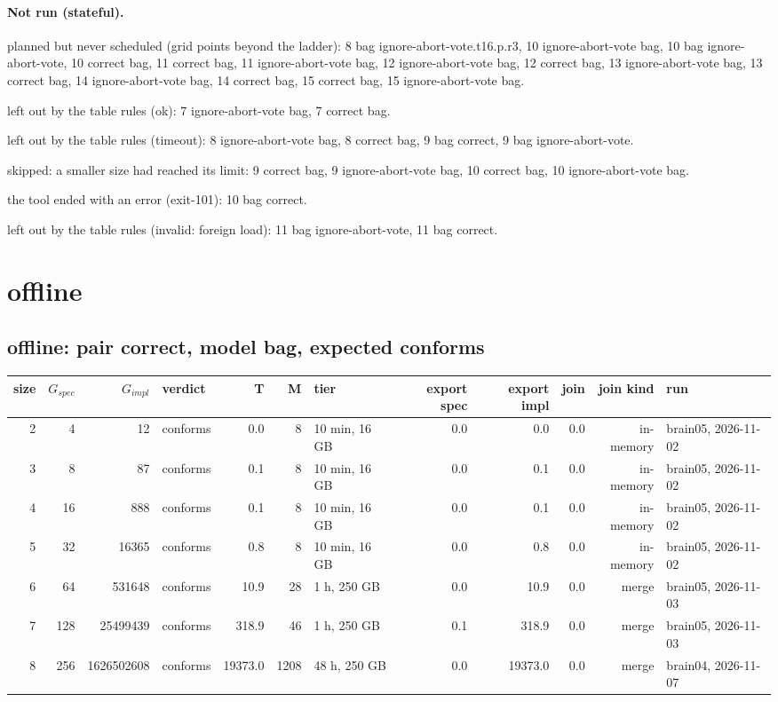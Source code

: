 \documentclass[10pt]{article}
\begin{document}
\paragraph{Not run (stateful).}
planned but never scheduled (grid points beyond the ladder): 8 bag ignore-abort-vote.t16.p.r3, 10 ignore-abort-vote bag, 10 bag ignore-abort-vote, 10 correct bag, 11 correct bag, 11 ignore-abort-vote bag, 12 ignore-abort-vote bag, 12 correct bag, 13 ignore-abort-vote bag, 13 correct bag, 14 ignore-abort-vote bag, 14 correct bag, 15 correct bag, 15 ignore-abort-vote bag.\par
left out by the table rules (ok): 7 ignore-abort-vote bag, 7 correct bag.\par
left out by the table rules (timeout): 8 ignore-abort-vote bag, 8 correct bag, 9 bag correct, 9 bag ignore-abort-vote.\par
skipped: a smaller size had reached its limit: 9 correct bag, 9 ignore-abort-vote bag, 10 correct bag, 10 ignore-abort-vote bag.\par
the tool ended with an error (exit-101): 10 bag correct.\par
left out by the table rules (invalid: foreign load): 11 bag ignore-abort-vote, 11 bag correct.\par
\section*{offline}
\subsection*{offline: pair \textsf{correct}, model bag, expected conforms}
\begin{longtable}{@{}rrrlrrlrrrrl@{}}
\toprule
size & $G_{\mathit{spec}}$ & $G_{\mathit{impl}}$ & verdict & T & M & tier & export spec & export impl & join & join kind & run \\
\midrule
\endhead
\color{red} 2 & 4 & 12 & conforms & 0.0 & 8 & 10 min, 16 GB & 0.0 & 0.0 & 0.0 & in-memory & brain05, 2026-11-02 \\
\color{red} 3 & 8 & 87 & conforms & 0.1 & 8 & 10 min, 16 GB & 0.0 & 0.1 & 0.0 & in-memory & brain05, 2026-11-02 \\
\color{red} 4 & 16 & 888 & conforms & 0.1 & 8 & 10 min, 16 GB & 0.0 & 0.1 & 0.0 & in-memory & brain05, 2026-11-02 \\
\color{red} 5 & 32 & 16365 & conforms & 0.8 & 8 & 10 min, 16 GB & 0.0 & 0.8 & 0.0 & in-memory & brain05, 2026-11-02 \\
\color{blue} 6 & 64 & 531648 & conforms & 10.9 & 28 & 1 h, 250 GB & 0.0 & 10.9 & 0.0 & merge & brain05, 2026-11-03 \\
\color{blue} 7 & 128 & 25499439 & conforms & 318.9 & 46 & 1 h, 250 GB & 0.1 & 318.9 & 0.0 & merge & brain05, 2026-11-03 \\
\color{blue} 8 & 256 & 1626502608 & conforms & 19373.0 & 1208 & 48 h, 250 GB & 0.0 & 19373.0 & 0.0 & merge & brain04, 2026-11-07 \\
\bottomrule
\end{longtable}
\end{document}

